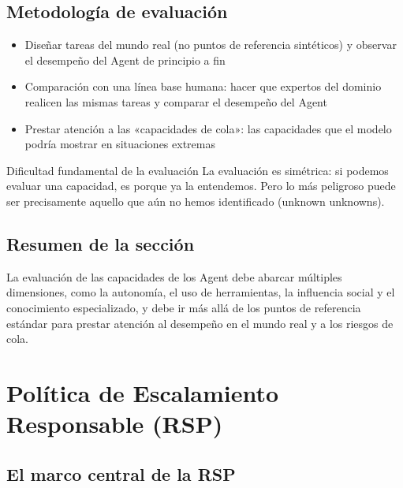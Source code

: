 \documentclass[a4paper]{article}
\begin{document}
\subsection{Metodología de evaluación}

\begin{itemize}
    \item Diseñar tareas del mundo real (no puntos de referencia sintéticos) y observar el desempeño del Agent de principio a fin
    \item Comparación con una línea base humana: hacer que expertos del dominio realicen las mismas tareas y comparar el desempeño del Agent
    \item Prestar atención a las «capacidades de cola»: las capacidades que el modelo podría mostrar en situaciones extremas
\end{itemize}

\begin{warningbox}{Dificultad fundamental de la evaluación}
La evaluación es simétrica: si podemos evaluar una capacidad, es porque ya la entendemos. Pero lo más peligroso puede ser precisamente aquello que aún no hemos identificado (unknown unknowns).
\end{warningbox}

\subsection{Resumen de la sección}

La evaluación de las capacidades de los Agent debe abarcar múltiples dimensiones, como la autonomía, el uso de herramientas, la influencia social y el conocimiento especializado, y debe ir más allá de los puntos de referencia estándar para prestar atención al desempeño en el mundo real y a los riesgos de cola.

\section{Política de Escalamiento Responsable (RSP)}

\subsection{El marco central de la RSP}
\end{document}
